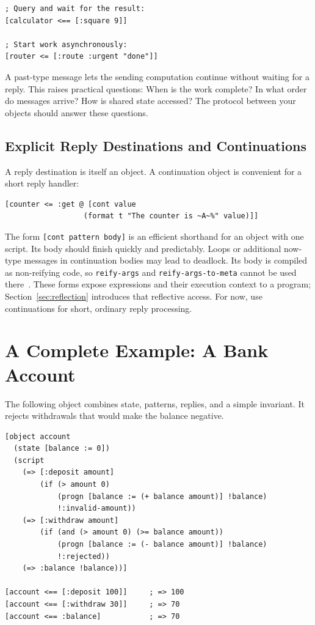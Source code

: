\documentclass[11pt,a4paper]{article}
\newcommand{\code}[1]{\texttt{#1}}
\newenvironment{codeblock}{%
  \par\addvspace{\medskipamount}\noindent
  \begin{minipage}{\linewidth}%
  \vspace*{\medskipamount}%
  \lstset{aboveskip=0pt,belowskip=0pt}%
}{%
  \end{minipage}\par\addvspace{\medskipamount}}
\begin{document}
\begin{lstlisting}
; Query and wait for the result:
[calculator <== [:square 9]]

; Start work asynchronously:
[router <= [:route :urgent "done"]]
\end{lstlisting}

A past-type message lets the sending computation continue without waiting
for a reply. This raises practical questions: When is the work complete?
In what order do messages arrive? How is shared state accessed?
The protocol between your objects should answer these questions.

\subsection{Explicit Reply Destinations and Continuations}

A reply destination is itself an object.
A continuation object is convenient for a short reply handler:

\begin{lstlisting}
[counter <= :get @ [cont value
                  (format t "The counter is ~A~%" value)]]
\end{lstlisting}

The form \code{[cont pattern body]} is an efficient shorthand for an object
with one script. Its body should finish quickly and predictably.
Loops or additional now-type messages in continuation bodies may lead
to deadlock.
Its body is compiled as non-reifying code, so \code{reify-args} and
\code{reify-args-to-meta} cannot be used there~\cite{guide}.
These forms expose expressions and their execution context to a program;
Section~\ref{sec:reflection} introduces that reflective access.
For now, use continuations for short, ordinary reply processing.



\section{A Complete Example: A Bank Account}
\label{sec:account}

The following object combines state, patterns, replies, and a simple
invariant. It rejects withdrawals that would make the balance negative.

\begin{codeblock}
\begin{lstlisting}
[object account
  (state [balance := 0])
  (script
    (=> [:deposit amount]
        (if (> amount 0)
            (progn [balance := (+ balance amount)] !balance)
            !:invalid-amount))
    (=> [:withdraw amount]
        (if (and (> amount 0) (>= balance amount))
            (progn [balance := (- balance amount)] !balance)
            !:rejected))
    (=> :balance !balance))]

[account <== [:deposit 100]]     ; => 100
[account <== [:withdraw 30]]     ; => 70
[account <== :balance]           ; => 70
\end{lstlisting}
\end{codeblock}
\end{document}
